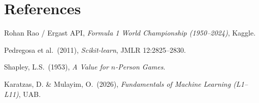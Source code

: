 \documentclass[10pt,a4paper,twocolumn]{article}
\begin{document}
\section*{References}
\begin{enumerate}[label={[\arabic*]}, leftmargin=1.5em, itemsep=1.5pt, topsep=2pt, font=\footnotesize]
  \item {\footnotesize Rohan Rao / Ergast API, \textit{Formula 1 World Championship (1950--2024)}, Kaggle.}
  \item {\footnotesize Pedregosa et al.\ (2011), \textit{Scikit-learn}, JMLR 12:2825--2830.}
  \item {\footnotesize Shapley, L.S.\ (1953), \textit{A Value for $n$-Person Games}.}
  \item {\footnotesize Karatzas, D. \& Mulayim, O.\ (2026), \textit{Fundamentals of Machine Learning (L1--L11)}, UAB.}
\end{enumerate}
\end{document}
